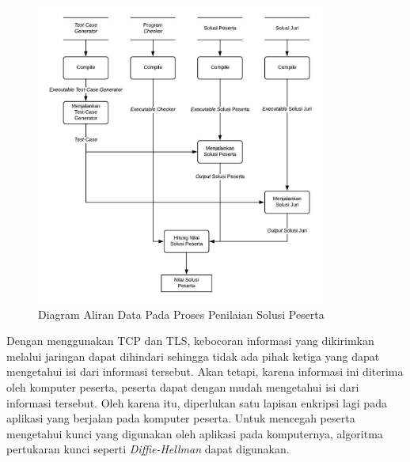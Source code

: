 \begin{figure}[ht!]
    \centering
    \includegraphics[width=0.85\textwidth]{images/grading-dfd}
    \caption{Diagram Aliran Data Pada Proses Penilaian Solusi Peserta}
    \label{fig:grading-dfd}
\end{figure}

\par Dengan menggunakan TCP dan TLS, kebocoran informasi yang dikirimkan melalui jaringan dapat dihindari sehingga tidak ada pihak ketiga yang dapat mengetahui isi dari informasi tersebut. Akan tetapi, karena informasi ini diterima oleh komputer peserta, peserta dapat dengan mudah mengetahui isi dari informasi tersebut. Oleh karena itu, diperlukan satu lapisan enkripsi lagi pada aplikasi yang berjalan pada komputer peserta. Untuk mencegah peserta mengetahui kunci yang digunakan oleh aplikasi pada komputernya, algoritma pertukaran kunci seperti \textit{Diffie-Hellman} dapat digunakan.

